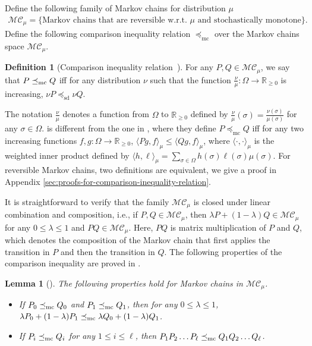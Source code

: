 \documentclass[11pt,a4paper]{article}
\newcommand{\mc}{\preceq_{\textnormal{mc}}}
\newtheorem{lemma}[theorem]{Lemma}
\theoremstyle{definition}
\newtheorem{definition}[theorem]{Definition}
\def\+#1{\mathcal{#1}} %
\begin{document}
Define the following family of Markov chains for distribution $\mu$
\begin{align}\label{eq:mc-set}
    \+{MC}_\mu = \{ \text{Markov chains that are reversible w.r.t. $\mu$ and stochastically monotone}\}.
\end{align}
Define the following comparison inequality relation $\preceq_{\text{mc}}$ over the Markov chains space $\+{MC}_\mu$.
\begin{definition}[Comparison inequality relation~\cite{FillK13}]\label{def:comparison-inequality-relation}
   For any $P,Q \in \+{MC}_\mu$, we say that $P\mc Q$ iff for any distribution $\nu$ such that the function $\frac{\nu}{\mu}:\Omega \to \mathbb{R}_{\geq 0}$ is increasing, $\nu P \preceq_{\text{sd}} \nu Q$.
\end{definition}
The notation $\frac{\nu}{\mu}$ denotes a function from $\Omega$ to $\mathbb{R}_{\geq 0}$ defined by $\frac{\nu}{\mu}(\sigma) = \frac{\nu(\sigma)}{\mu(\sigma)}$ for any $\sigma \in \Omega$. %
 is different from the one in \cite{FillK13}, where they define $P \preceq_{\text{mc}} Q$ iff for any two increasing functions $f,g:\Omega \to \mathbb{R}_{\geq 0}$, $\langle Pg, f \rangle_\mu \leq \langle Qg, f \rangle_\mu$, where $\langle \cdot, \cdot \rangle_\mu$ is the weighted inner product defined by $\langle h, \ell \rangle_\mu = \sum_{\sigma \in \Omega} h(\sigma)\ell(\sigma)\mu(\sigma)$. 
For reversible Markov chains, two definitions are equivalent, we give a proof in Appendix \ref{sec:proofs-for-comparison-inequality-relation}.

It is straightforward to verify that the family $\+{MC}_{\mu}$ is closed under linear combination and composition, i.e., if $P,Q \in \+{MC}_{\mu}$, then $\lambda P + (1-\lambda)Q \in \+{MC}_{\mu}$ for any $0 \leq \lambda \leq 1$ and $P Q \in \+{MC}_{\mu}$.
Here, $PQ$ is matrix multiplication of $P$ and $Q$, which denotes the composition of the Markov chain that first applies the transition in $P$ and then the transition in $Q$.
The following properties of the comparison inequality are proved in \cite{FillK13}.
\begin{lemma}[]\label{lem:comparison-inequality-properties}
The following properties hold for Markov chains in $\+{MC}_\mu$.
\begin{itemize}
 \item If $P_0 \mc Q_0$ and $P_1 \mc Q_1$, then for any $0 \leq \lambda \leq 1$, $\lambda P_0 + (1-\lambda)P_1 \mc \lambda Q_0 + (1-\lambda)Q_1$.
 \item If $P_i \mc Q_i$ for any $1\leq i \leq \ell$, then $P_1P_2\ldots P_\ell \mc Q_1Q_2\ldots Q_\ell$.
\end{itemize}
\end{lemma}
\end{document}
